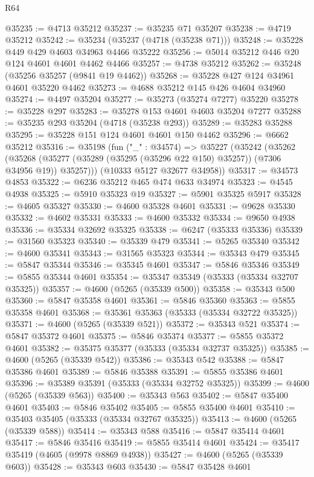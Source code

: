\begin{lexlean}{R64}
\begin{coremodule}
@35235 := @4713 @35212
@35237 := @35235 @71 @35207
@35238 := @4719 @35212
@35242 := @35234 (@35237 (@4718 (@35238 @71)))
@35248 := @35228 @449 @429 @4603 @34963 @4466 @35222
@35256 := @5014 @35212 @446 @20 @124 @4601 @4601 @4462 @4466
@35257 := @4738 @35212
@35262 := @35248 (@35256 @35257 (@9841 @19 @4462))
@35268 := @35228 @427 @124 @34961 @4601 @35220 @4462
@35273 := @4688 @35212 @145 @426 @4604 @34960
@35274 := @4497 @35204
@35277 := @35273 (@35274 @7277) @35220
@35278 := @35228 @297
@35283 := @35278 @153 @4601 @4603 @35204 @7277
@35288 := @35235 @293 @35204 (@4718 (@35238 @293))
@35289 := @35283 @35288
@35295 := @35228 @151 @124 @4601 @4601 @150 @4462
@35296 := @6662 @35212
@35316 := @35198
    (fun ("_" : @34574) =>
    @35227
      (@35242
        (@35262
          (@35268 (@35277 (@35289 (@35295 (@35296 @22 @150) @35257)) (@7306 @34956 @19)) @35257)))
      (@10333 @5127 @32677 @34958))
@35317 := @34573 @4853
@35322 := @6236 @35212 @465 @474 @633 @34974
@35323 := @4545 @4938
@35325 := @5910 @35323 @19
@35327 := @5901 @35325 @5917
@35328 := @4605 @35327
@35330 := @4600 @35328 @4601
@35331 := @9628 @35330
@35332 := @4602 @35331
@35333 := @4600 @35332
@35334 := @9650 @4938
@35336 := @35334 @32692 @35325
@35338 := @6247 (@35333 @35336)
@35339 := @31560 @35323
@35340 := @35339 @479
@35341 := @5265 @35340
@35342 := @4600 @35341
@35343 := @31565 @35323
@35344 := @35343 @479
@35345 := @5847 @35344
@35346 := @35345 @4601
@35347 := @5846 @35346
@35349 := @5855 @35344 @4601
@35354 := @35347 @35349 (@35333 (@35334 @32707 @35325))
@35357 := @4600 (@5265 (@35339 @500))
@35358 := @35343 @500
@35360 := @5847 @35358 @4601
@35361 := @5846 @35360
@35363 := @5855 @35358 @4601
@35368 := @35361 @35363 (@35333 (@35334 @32722 @35325))
@35371 := @4600 (@5265 (@35339 @521))
@35372 := @35343 @521
@35374 := @5847 @35372 @4601
@35375 := @5846 @35374
@35377 := @5855 @35372 @4601
@35382 := @35375 @35377 (@35333 (@35334 @32737 @35325))
@35385 := @4600 (@5265 (@35339 @542))
@35386 := @35343 @542
@35388 := @5847 @35386 @4601
@35389 := @5846 @35388
@35391 := @5855 @35386 @4601
@35396 := @35389 @35391 (@35333 (@35334 @32752 @35325))
@35399 := @4600 (@5265 (@35339 @563))
@35400 := @35343 @563
@35402 := @5847 @35400 @4601
@35403 := @5846 @35402
@35405 := @5855 @35400 @4601
@35410 := @35403 @35405 (@35333 (@35334 @32767 @35325))
@35413 := @4600 (@5265 (@35339 @588))
@35414 := @35343 @588
@35416 := @5847 @35414 @4601
@35417 := @5846 @35416
@35419 := @5855 @35414 @4601
@35424 := @35417 @35419 (@4605 (@9978 @8869 @4938))
@35427 := @4600 (@5265 (@35339 @603))
@35428 := @35343 @603
@35430 := @5847 @35428 @4601

\end{coremodule}
\end{lexlean}
